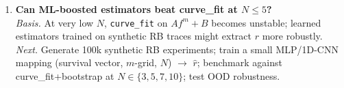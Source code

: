 \begin{enumerate}
\item \textbf{Can ML-boosted estimators beat curve\_fit at $N\leq 5$?}\\
  \emph{Basis.} At very low $N$, \texttt{curve\_fit} on
  $A f^m + B$ becomes unstable; learned estimators trained on synthetic
  RB traces might extract $r$ more robustly.\\
  \emph{Next.} Generate 100k synthetic RB experiments; train a small
  MLP/1D-CNN mapping (survival vector, $m$-grid, $N$) $\rightarrow$
  $\hat r$; benchmark against curve\_fit+bootstrap at $N\in\{3,5,7,10\}$;
  test OOD robustness.
\end{enumerate}
